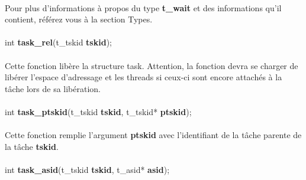 \documentclass[10pt,a4wide]{article}
\begin{document}
\paragraph{}

Pour plus d'informations \`a propos du type \textbf{t\_wait} et des
informations qu'il contient, r\'ef\'erez vous \`a la section Types.

\paragraph{}

\hspace{1.5cm}int \textbf{task\_rel}(t\_tskid \textbf{tskid});

\paragraph{}

Cette fonction lib\`ere la structure task. Attention, la fonction
devra se charger de lib\'erer l'espace d'adressage et les threads
si ceux-ci sont encore attach\'es \`a la t\^ache lors de sa lib\'eration.

\paragraph{}

\hspace{1.5cm}int \textbf{task\_ptskid}(t\_tskid \textbf{tskid},
                                        t\_tskid* \textbf{ptskid});

\paragraph{}

Cette fonction remplie l'argument \textbf{ptskid} avec l'identifiant de
la t\^ache parente de la t\^ache \textbf{tskid}.

\paragraph{}

\hspace{1.5cm}int \textbf{task\_asid}(t\_tskid \textbf{tskid},
                                      t\_asid* \textbf{asid});

\paragraph{}
\end{document}
